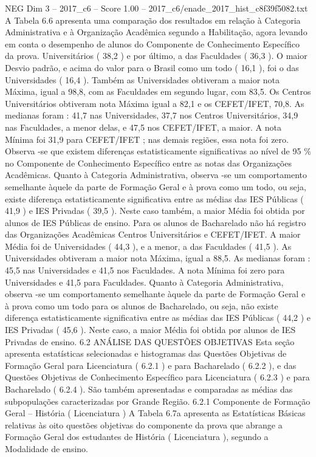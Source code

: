 \begin{textsample}{NEG Dim 3 – 2017\_c6 – Score 1.00 – 2017\_c6/enade\_2017\_hist\_c8f39f5082.txt}
A Tabela 6.6 apresenta uma comparação dos resultados em relação à Categoria Administrativa e à Organização Acadêmica segundo a Habilitação, agora levando em conta o desempenho de alunos do Componente de Conhecimento Específico da prova.
Universitários ( 38,2 ) e por último, a das Faculdades ( 36,3 ).
O maior Desvio padrão, e acima do valor para o Brasil como um todo ( 16,1 ), foi o das Universidades ( 16,4 ).
Também as Universidades obtiveram a maior nota Máxima, igual a 98,8, com as Faculdades em segundo lugar, com 83,5.
Os Centros Universitários obtiveram nota Máxima igual a 82,1 e os CEFET/IFET, 70,8.
As medianas foram : 41,7 nas Universidades, 37,7 nos Centros Universitários, 34,9 nas Faculdades, a menor delas, e 47,5 nos CEFET/IFET, a maior.
A nota Mínima foi 31,9 para CEFET/IFET ; nas demais regiões, essa nota foi zero.
Observa -se que existem diferenças estatisticamente significativas ao nível de 95 \% no Componente de Conhecimento Específico entre as notas das Organizações Acadêmicas.
Quanto à Categoria Administrativa, observa -se um comportamento semelhante àquele da parte de Formação Geral e à prova como um todo, ou seja, existe diferença estatisticamente significativa entre as médias das IES Públicas ( 41,9 ) e IES Privadas ( 39,5 ).
Neste caso também, a maior Média foi obtida por alunos de IES Públicas de ensino.
Para os alunos de Bacharelado não há registro das Organizações Acadêmicas Centros Universitários e CEFET/IFET.
A maior Média foi de Universidades ( 44,3 ), e a menor, a das Faculdades ( 41,5 ).
As Universidades obtiveram a maior nota Máxima, igual a 88,5.
As medianas foram : 45,5 nas Universidades e 41,5 nos Faculdades.
A nota Mínima foi zero para Universidades e 41,5 para Faculdades.
Quanto à Categoria Administrativa, observa -se um comportamento semelhante àquele da parte de Formação Geral e à prova como um todo para os alunos de Bacharelado, ou seja, não existe diferença estatisticamente significativa entre as médias das IES Públicas ( 44,2 ) e IES Privadas ( 45,6 ).
Neste caso, a maior Média foi obtida por alunos de IES Privadas de ensino. 6.2 ANÁLISE DAS QUESTÕES OBJETIVAS Esta seção apresenta estatísticas selecionadas e histogramas das Questões Objetivas de Formação Geral para Licenciatura ( 6.2.1 ) e para Bacharelado ( 6.2.2 ), e das Questões Objetivas de Conhecimento Específico para Licenciatura ( 6.2.3 ) e para Bacharelado ( 6.2.4 ).
São também apresentadas e comparadas as médias das subpopulações caracterizadas por Grande Região. 6.2.1 Componente de Formação Geral – História ( Licenciatura ) A Tabela 6.7a apresenta as Estatísticas Básicas relativas às oito questões objetivas do componente da prova que abrange a Formação Geral dos estudantes de História ( Licenciatura ), segundo a Modalidade de ensino.

\end{textsample}
